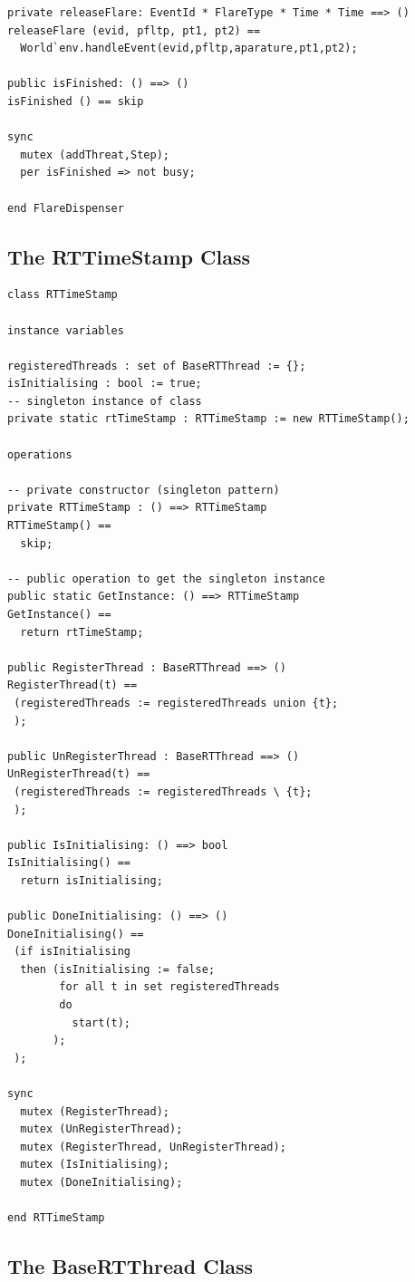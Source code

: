 \documentclass{overturerepchap}
\begin{document}
\begin{lstlisting}
private releaseFlare: EventId * FlareType * Time * Time ==> ()
releaseFlare (evid, pfltp, pt1, pt2) == 
  World`env.handleEvent(evid,pfltp,aparature,pt1,pt2);

public isFinished: () ==> ()
isFinished () == skip

sync
  mutex (addThreat,Step);
  per isFinished => not busy;

end FlareDispenser
\end{lstlisting}

\subsection{The RTTimeStamp Class}

\begin{lstlisting}
class RTTimeStamp

instance variables

registeredThreads : set of BaseRTThread := {};
isInitialising : bool := true;
-- singleton instance of class
private static rtTimeStamp : RTTimeStamp := new RTTimeStamp();

operations

-- private constructor (singleton pattern)
private RTTimeStamp : () ==> RTTimeStamp
RTTimeStamp() ==
  skip;

-- public operation to get the singleton instance
public static GetInstance: () ==> RTTimeStamp
GetInstance() ==
  return rtTimeStamp;

public RegisterThread : BaseRTThread ==> ()
RegisterThread(t) ==
 (registeredThreads := registeredThreads union {t};  
 );
 
public UnRegisterThread : BaseRTThread ==> ()
UnRegisterThread(t) ==
 (registeredThreads := registeredThreads \ {t};
 );
 
public IsInitialising: () ==> bool
IsInitialising() ==
  return isInitialising;
 
public DoneInitialising: () ==> ()
DoneInitialising() ==
 (if isInitialising
  then (isInitialising := false;
        for all t in set registeredThreads 
        do
          start(t);
       );
 );
 
sync 
  mutex (RegisterThread);
  mutex (UnRegisterThread);
  mutex (RegisterThread, UnRegisterThread);
  mutex (IsInitialising);
  mutex (DoneInitialising);

end RTTimeStamp
\end{lstlisting}

\subsection{The BaseRTThread Class}
\end{document}
